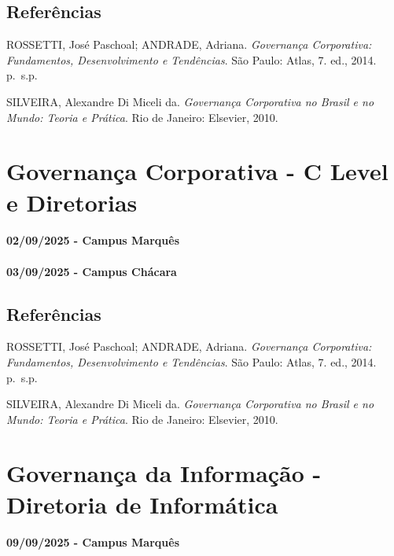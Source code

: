 \documentclass[
]{book}
\begin{document}
\section{Referências}\label{referuxeancias-2}

ROSSETTI, José Paschoal; ANDRADE, Adriana. \emph{Governança Corporativa: Fundamentos, Desenvolvimento e Tendências}. São Paulo: Atlas, 7. ed., 2014. p.~s.p.

SILVEIRA, Alexandre Di Miceli da. \emph{Governança Corporativa no Brasil e no Mundo: Teoria e Prática}. Rio de Janeiro: Elsevier, 2010.

\chapter{Governança Corporativa - C Level e Diretorias}\label{governanuxe7a-corporativa---c-level-e-diretorias}

\subsubsection*{02/09/2025 - Campus Marquês}\label{campus-marquuxeas-4}

\subsubsection*{03/09/2025 - Campus Chácara}\label{campus-chuxe1cara-4}

\section{Referências}\label{referuxeancias-3}

ROSSETTI, José Paschoal; ANDRADE, Adriana. \emph{Governança Corporativa: Fundamentos, Desenvolvimento e Tendências}. São Paulo: Atlas, 7. ed., 2014. p.~s.p.

SILVEIRA, Alexandre Di Miceli da. \emph{Governança Corporativa no Brasil e no Mundo: Teoria e Prática}. Rio de Janeiro: Elsevier, 2010.

\chapter{Governança da Informação - Diretoria de Informática}\label{governanuxe7a-da-informauxe7uxe3o---diretoria-de-informuxe1tica}

\subsubsection*{09/09/2025 - Campus Marquês}\label{campus-marquuxeas-5}
\end{document}
